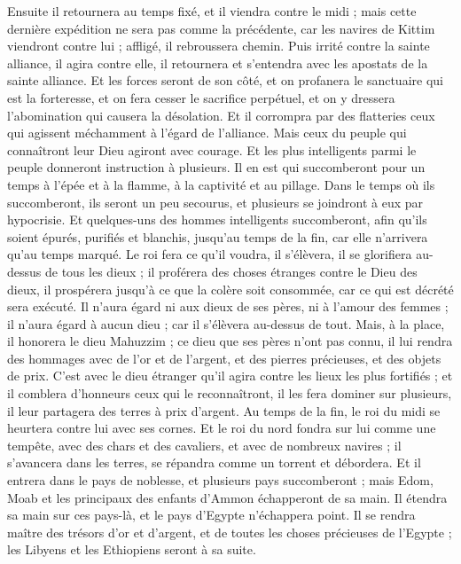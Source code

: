 \begin{multicols}{2}
Ensuite il retournera au temps fixé, et il viendra contre le midi ; mais cette dernière expédition ne sera pas comme la précédente,
car les navires de Kittim viendront contre lui ; affligé, il rebroussera chemin. Puis irrité contre la sainte alliance, il agira contre elle, il retournera et s'entendra avec les apostats de la sainte alliance.
Et les forces seront de son côté, et on profanera le sanctuaire qui est la forteresse, et on fera cesser le sacrifice perpétuel, et on y dressera l'abomination qui causera la désolation.
Et il corrompra par des flatteries ceux qui agissent méchamment à l'égard de l'alliance. Mais ceux du peuple qui connaîtront leur Dieu agiront avec courage.
Et les plus intelligents parmi le peuple donneront instruction à plusieurs. Il en est qui succomberont pour un temps à l'épée et à la flamme, à la captivité et au pillage.
Dans le temps où ils succomberont, ils seront un peu secourus, et plusieurs se joindront à eux par hypocrisie.
Et quelques-uns des hommes intelligents succomberont, afin qu'ils soient épurés, purifiés et blanchis, jusqu'au temps de la fin, car elle n'arrivera qu'au temps marqué.
Le roi fera ce qu'il voudra, il s'élèvera, il se glorifiera au-dessus de tous les dieux ; il proférera des choses étranges contre le Dieu des dieux, il prospérera jusqu'à ce que la colère soit consommée, car ce qui est décrété sera exécuté.
Il n'aura égard ni aux dieux de ses pères, ni à l'amour des femmes ; il n'aura égard à aucun dieu ; car il s'élèvera au-dessus de tout.
Mais, à la place, il honorera le dieu Mahuzzim ; ce dieu que ses pères n'ont pas connu, il lui rendra des hommages avec de l'or et de l'argent, et des pierres précieuses, et des objets de prix.
C'est avec le dieu étranger qu'il agira contre les lieux les plus fortifiés ; et il comblera d'honneurs ceux qui le reconnaîtront, il les fera dominer sur plusieurs, il leur partagera des terres à prix d'argent.
Au temps de la fin, le roi du midi se heurtera contre lui avec ses cornes. Et le roi du nord fondra sur lui comme une tempête, avec des chars et des cavaliers, et avec de nombreux navires ; il s'avancera dans les terres, se répandra comme un torrent et débordera.
Et il entrera dans le pays de noblesse, et plusieurs pays succomberont ; mais Edom, Moab et les principaux des enfants d'Ammon échapperont de sa main.
Il étendra sa main sur ces pays-là, et le pays d'Egypte n'échappera point.
Il se rendra maître des trésors d'or et d'argent, et de toutes les choses précieuses de l'Egypte ; les Libyens et les Ethiopiens seront à sa suite.

\end{multicols}
